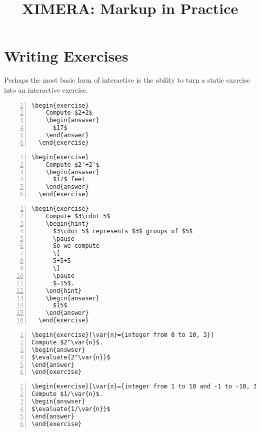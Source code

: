 \documentclass{amsart}
\begin{document}
\title{XIMERA: Markup in Practice} %
\maketitle

\section{Writing Exercises}

Perhaps the most basic form of interactive is the ability to turn a
static exercise into an interactive exercise.

\begin{Verbatim}[frame=single,numbers=left]
  \begin{exercise}
    Compute $2+2$
    \begin{answser}
      $17$
    \end{answer}
  \end{exercise}
\end{Verbatim}

\begin{Verbatim}[frame=single,numbers=left]
  \begin{exercise}
    Compute $2'+2'$
    \begin{answser}
      $17$ feet
    \end{answer}
  \end{exercise}
\end{Verbatim}


\begin{Verbatim}[frame=single,numbers=left]
  \begin{exercise}
    Compute $3\cdot 5$
    \begin{hint}
      $3\cdot 5$ represents $3$ groups of $5$
      \pause
      So we compute
      \[
      5+5+5
      \]
      \pause
      $=15$. 
    \end{hint}
    \begin{answser}
      $15$
    \end{answer}
  \end{exercise}
\end{Verbatim}


\begin{Verbatim}[frame=single,numbers=left]
\begin{exercise}[\var{n}={integer from 0 to 10, 3}]
Compute $2^\var{n}$.
\begin{answser}
$\evaluate{2^\var{n}}$ 
\end{answer}
\end{exercise}
\end{Verbatim}



\begin{Verbatim}[frame=single,numbers=left]
\begin{exercise}[\var{n}={integer from 1 to 10 and -1 to -10, 3}]
Compute $1/\var{n}$.
\begin{answser}
$\evaluate{1/\var{n}}$ 
\end{answer}
\end{exercise}
\end{Verbatim}
\end{document}
